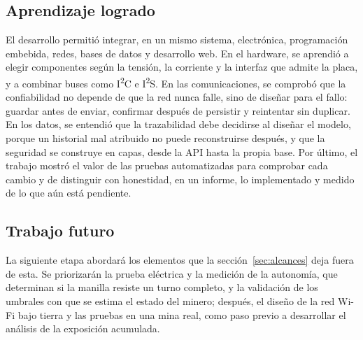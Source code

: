 \documentclass[10pt,a4paper]{article}
\begin{document}
\subsection{Aprendizaje logrado}
El desarrollo permitió integrar, en un mismo sistema, electrónica, programación embebida, redes, bases de datos y desarrollo web. En el hardware, se aprendió a elegir componentes según la tensión, la corriente y la interfaz que admite la placa, y a combinar buses como I\textsuperscript{2}C e I\textsuperscript{2}S. En las comunicaciones, se comprobó que la confiabilidad no depende de que la red nunca falle, sino de diseñar para el fallo: guardar antes de enviar, confirmar después de persistir y reintentar sin duplicar. En los datos, se entendió que la trazabilidad debe decidirse al diseñar el modelo, porque un historial mal atribuido no puede reconstruirse después, y que la seguridad se construye en capas, desde la API hasta la propia base. Por último, el trabajo mostró el valor de las pruebas automatizadas para comprobar cada cambio y de distinguir con honestidad, en un informe, lo implementado y medido de lo que aún está pendiente.

\subsection{Trabajo futuro}
La siguiente etapa abordará los elementos que la sección~\ref{sec:alcances} deja fuera de esta. Se priorizarán la prueba eléctrica y la medición de la autonomía, que determinan si la manilla resiste un turno completo, y la validación de los umbrales con que se estima el estado del minero; después, el diseño de la red Wi-Fi bajo tierra y las pruebas en una mina real, como paso previo a desarrollar el análisis de la exposición acumulada.
\end{document}

